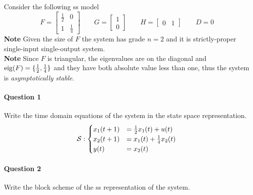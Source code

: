 
\begin{example}
    Consider the following \gls{ss} model
    \[
    F = \begin{bmatrix}
        \frac{1}{2} & 0 \\
        1   & \frac{1}{4}
    \end{bmatrix}
    \qquad
    G = \begin{bmatrix}
        1 \\ 0
    \end{bmatrix}
    \qquad
    H = \begin{bmatrix}
        0 & 1
    \end{bmatrix}
    \qquad
    D = 0
    \]
    \textbf{Note} Given the size of $F$ the system has grade $n=2$ and it is strictly-proper single-input single-output system. \\
    \textbf{Note} Since $F$ is triangular, the eigenvalues are on the diagonal and $\operatorname*{eig} (F) = \{\frac{1}{2}, \frac{1}{4}\}$ and they have both absolute value less than one, thus the system is \emph{asymptotically stable}.

    \paragraph{Question 1} Write the time domain equations of the system in the state space representation.
    \[
        \mathcal{S}:
        \begin{cases}
            x_1(t+1) &= \frac{1}{2}x_1(t) + u(t) \\
            x_2(t+1) &= x_1(t) + \frac{1}{4}x_2(t) \\
            y(t) &= x_2(t)
        \end{cases}
    \]

    \paragraph{Question 2} Write the block scheme of the \gls{ss} representation of the system.
    \begin{figure}[H]
        \centering
\end{figure}
\end{example}
